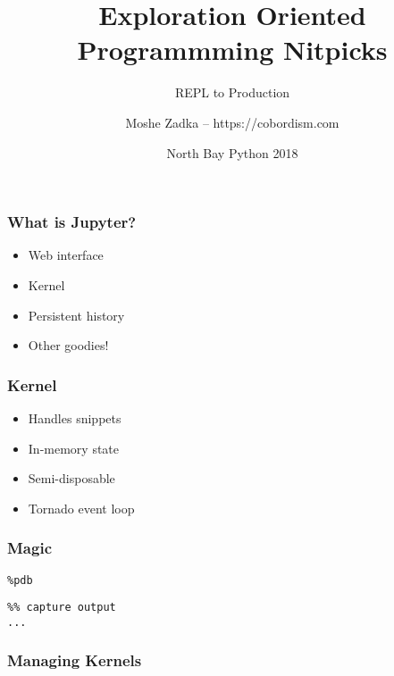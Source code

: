 \usepackage[utf8]{inputenc}
\usepackage{listings}
\usepackage{textcomp}

\title{Exploration Oriented Programmming Nitpicks}
\subtitle{REPL to Production}
\author{Moshe Zadka -- https://cobordism.com}
\date{North Bay Python 2018}
 

 
\begin{titlepage}
\maketitle
\end{titlepage}

\frame{\titlepage}

\begin{frame}
\frametitle{What is Jupyter?}

\begin{itemize}
\item Web interface
\item Kernel
\item Persistent history
\item Other goodies!
\end{itemize}

\end{frame}

\begin{frame}
\frametitle{Kernel}

\begin{itemize}
\item Handles snippets
\item In-memory state
\item Semi-disposable
\item Tornado event loop
\end{itemize}

\end{frame}

\begin{frame}[fragile]
\frametitle{Magic}

\begin{lstlisting}
%pdb
\end{lstlisting}

\begin{lstlisting}
%% capture output
...
\end{lstlisting}

\end{frame}

\begin{frame}
\frametitle{Managing Kernels}
\end{frame}

